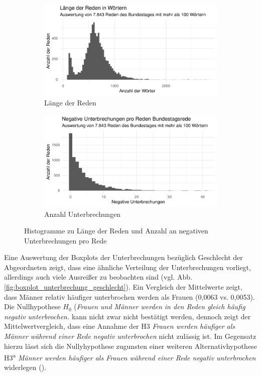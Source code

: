 \documentclass[12pt, 
    twoside=false, 
    bibliography=totoc, 
    numbers=endperiod, 
    headings=normal, 
    toc=chapterentrydotfill
    ]{scrbook}
\begin{document}
\begin{figure}[H]
    \centering
    \begin{subfigure}{.5\textwidth}
      \centering
      \includegraphics[width=.9\linewidth]{document/images/histo_laenge_rede.pdf}
      \caption{Länge der Reden}
      \label{fig:histo_laenge}
    \end{subfigure}%
    \begin{subfigure}{.5\textwidth}
      \centering
      \includegraphics[width=.9\linewidth]{document/images/histo_anzahl_unterbrechung.pdf}
      \caption{Anzahl Unterbrechungen}
      \label{fig:histo_unterbrechung}
    \end{subfigure}
    \caption[Histogramme zu Länge der Reden und Anzahl an negativen Unterbrechungen pro Rede]{Histogramme zu Länge der Reden und Anzahl an negativen Unterbrechungen pro Rede}
    \label{fig:histogramme}
\end{figure}

Eine Auswertung der Boxplots der Unterbrechungen bezüglich Geschlecht der Abgeordneten zeigt, dass eine ähnliche Verteilung der Unterbrechungen vorliegt, allerdings auch viele Ausreißer zu beobachten sind (vgl. Abb. \ref{fig:boxplot_unterbrechung_geschlecht}). Ein Vergleich der Mittelwerte zeigt, dass Männer relativ häufiger unterbrochen werden als Frauen (0,0063 vs. 0,0053). Die Nullhypothese $H_0$ (\emph{Frauen und Männer werden in den Reden gleich häufig negativ unterbrochen.} kann nicht zwar nicht bestätigt werden, dennoch zeigt der Mittelwertvergleich, dass eine Annahme der H3 \emph{Frauen werden häufiger als Männer während einer Rede negativ unterbrochen} nicht zulässig ist. Im Gegensatz hierzu lässt sich die Nullyhypothese zugunsten einer weiteren Alternativhypothese H3\textsuperscript{a} \emph{Männer werden häufiger als Frauen während einer Rede negativ unterbrochen} widerlegen (). 
\end{document}
